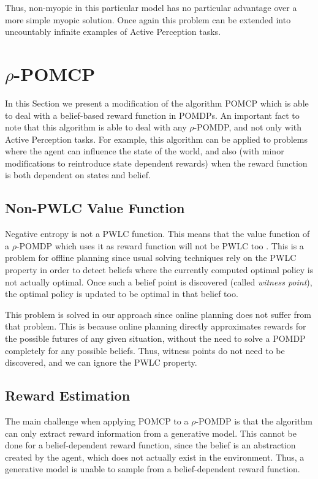 Thus, non-myopic in this particular model has no particular advantage over a more simple myopic
solution. Once again this problem can be extended into uncountably infinite examples of Active
Perception tasks.

\section{$\rho$-POMCP}

In this Section we present a modification of the algorithm POMCP which is able to deal with a
belief-based reward function in POMDPs. An important fact to note that this algorithm is able to
deal with any $\rho$-POMDP, and not only with Active Perception tasks. For example, this algorithm
can be applied to problems where the agent can influence the state of the world, and also (with
minor modifications to reintroduce state dependent rewards) when the reward function is both
dependent on states and belief.

\subsection{Non-PWLC Value Function}

Negative entropy is not a PWLC function. This means that the value function of a $\rho$-POMDP which
uses it as reward function will not be PWLC too \cite{cit:rpomdp}. This is a problem for offline
planning since usual solving techniques rely on the PWLC property in order to detect beliefs where
the currently computed optimal policy is not actually optimal. Once such a belief point is
discovered (called \textit{witness point}), the optimal policy is updated to be optimal in that
belief too.

This problem is solved in our approach since online planning does not suffer from that problem. This
is because online planning directly approximates rewards for the possible futures of any given
situation, without the need to solve a POMDP completely for any possible beliefs. Thus, witness
points do not need to be discovered, and we can ignore the PWLC property.

\subsection{Reward Estimation}

The main challenge when applying POMCP to a $\rho$-POMDP is that the algorithm can only extract
reward information from a generative model. This cannot be done for a belief-dependent reward
function, since the belief is an abstraction created by the agent, which does not actually exist in
the environment.  Thus, a generative model is unable to sample from a belief-dependent reward
function.

